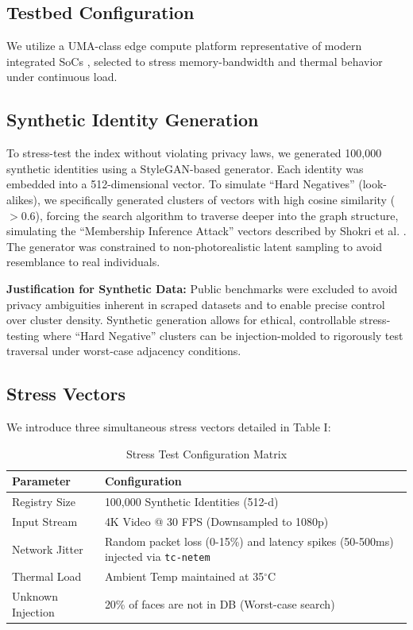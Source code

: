 \documentclass[conference]{IEEEtran}
\begin{document}
\subsection{Testbed Configuration}
We utilize a UMA-class edge compute platform representative of modern integrated SoCs \cite{b20}, selected to stress memory-bandwidth and thermal behavior under continuous load. 

\subsection{Synthetic Identity Generation}
To stress-test the index without violating privacy laws, we generated 100,000 synthetic identities using a StyleGAN-based generator. Each identity was embedded into a 512-dimensional vector. To simulate ``Hard Negatives'' (look-alikes), we specifically generated clusters of vectors with high cosine similarity ($>0.6$), forcing the search algorithm to traverse deeper into the graph structure, simulating the ``Membership Inference Attack'' vectors described by Shokri et al. \cite{b8}. The generator was constrained to non-photorealistic latent sampling to avoid resemblance to real individuals.

\textbf{Justification for Synthetic Data:} Public benchmarks were excluded to avoid privacy ambiguities inherent in scraped datasets and to enable precise control over cluster density. Synthetic generation allows for ethical, controllable stress-testing where ``Hard Negative'' clusters can be injection-molded to rigorously test traversal under worst-case adjacency conditions.

\subsection{Stress Vectors}
We introduce three simultaneous stress vectors detailed in Table I:

\begin{table}[htbp]
\caption{Stress Test Configuration Matrix}
\begin{center}
\begin{tabular}{l p{5cm}}
\toprule
\textbf{Parameter} & \textbf{Configuration} \\
\midrule
Registry Size & 100,000 Synthetic Identities (512-d) \\
Input Stream & 4K Video @ 30 FPS (Downsampled to 1080p) \\
Network Jitter & Random packet loss (0-15\%) and latency spikes (50-500ms) injected via \texttt{tc-netem} \\
Thermal Load & Ambient Temp maintained at 35$^\circ$C \\
Unknown Injection & 20\% of faces are not in DB (Worst-case search) \\
\bottomrule
\end{tabular}
\end{center}
\label{tab:stress}
\end{table}
\end{document}
